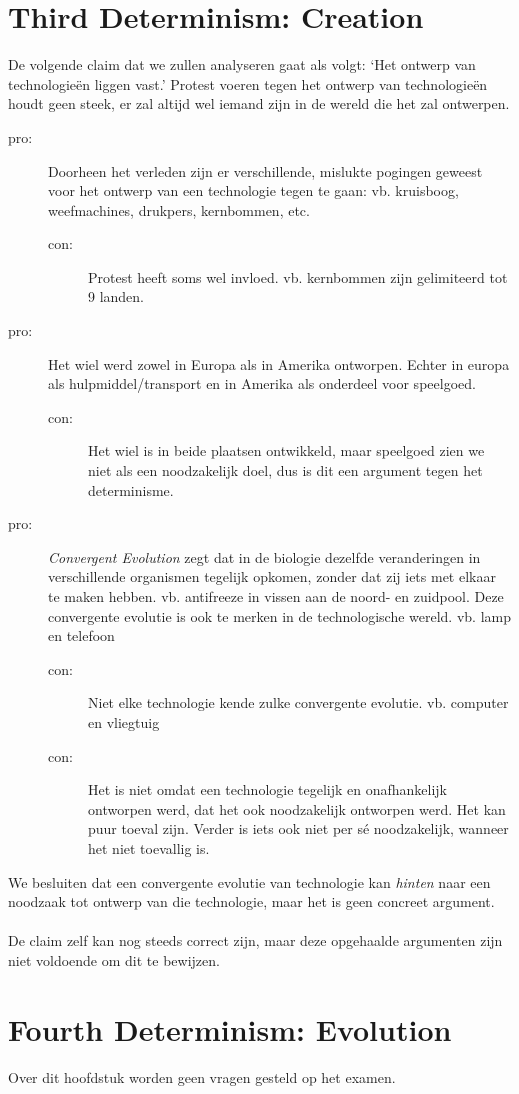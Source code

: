 \documentclass[../summary.tex]{subfiles}
\begin{document}
	\section{Third Determinism: Creation}
	De volgende claim dat we zullen analyseren gaat als volgt: `Het ontwerp van technologieën liggen vast.' Protest voeren tegen het ontwerp van technologieën houdt geen steek, er zal altijd wel iemand zijn in de wereld die het zal ontwerpen.
	\begin{description}
		\item[pro:] Doorheen het verleden zijn er verschillende, mislukte pogingen geweest voor het ontwerp van een technologie tegen te gaan: vb. kruisboog, weefmachines, drukpers, kernbommen, etc.
		\begin{description}
			\item[con:] Protest heeft soms wel invloed. vb. kernbommen zijn gelimiteerd tot 9 landen.
		\end{description}
		\item[pro:] Het wiel werd zowel in Europa als in Amerika ontworpen. Echter in europa als hulpmiddel/transport en in Amerika als onderdeel voor speelgoed.
		\begin{description}
			\item[con:] Het wiel is in beide plaatsen ontwikkeld, maar speelgoed zien we niet als een noodzakelijk doel, dus is dit een argument tegen het determinisme. 
		\end{description}
		\item[pro:] \emph{Convergent Evolution} zegt dat in de biologie dezelfde veranderingen in verschillende organismen tegelijk opkomen, zonder dat zij iets met elkaar te maken hebben. vb. antifreeze in vissen aan de noord- en zuidpool. Deze convergente evolutie is ook te merken in de technologische wereld. vb. lamp en telefoon
		\begin{description}
			\item[con:] Niet elke technologie kende zulke convergente evolutie. vb. computer en vliegtuig
			\item[con:] Het is niet omdat een technologie tegelijk en onafhankelijk ontworpen werd, dat het ook noodzakelijk ontworpen werd. Het kan puur toeval zijn. Verder is iets ook niet per sé noodzakelijk, wanneer het niet toevallig is.
		\end{description}
	\end{description}
	We besluiten dat een convergente evolutie van technologie kan \emph{hinten} naar een noodzaak tot ontwerp van die technologie, maar het is geen concreet argument.\\
	\\
	De claim zelf kan nog steeds correct zijn, maar deze opgehaalde argumenten zijn niet voldoende om dit te bewijzen.
	
	\section{Fourth Determinism: Evolution}
	Over dit hoofdstuk worden geen vragen gesteld op het examen.
		
\end{document}

